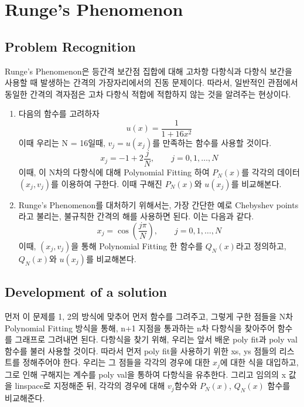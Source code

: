 \documentclass[11pt]{article}
\begin{document}
\section{Runge's Phenomenon}
\subsection{Problem Recognition} 
Runge's Phenomenon은 등간격 보간점 집합에 대해 고차항 다항식과 다항식 보간을 사용할 때 발생하는 간격의 가장자리에서의 진동 문제이다. 따라서, 일반적인 관점에서 동일한 간격의 격자점은 고차 다항식 적합에 적합하지 않는 것을 알려주는 현상이다.

\begin{enumerate}
    \item  다음의 함수를 고려하자
    \begin{equation}
    u(x) = \frac{1}{1 + 16x^2}
    \end{equation}
    이때 우리는 N = 16일때, $v_j = u(x_j)$를 만족하는 함수를 사용할 것이다. 
    \begin{equation}
    x_j = -1 + 2\frac{j}{N}
    ,\qquad
    j = 0, 1, \dots, N
    \end{equation}
    이때, 이 N차의 다항식에 대해 Polynomial Fitting 하여 $P_N(x)$를 각각의 데이터 $(x_j, v_j)$를 이용하여 구한다. 이때 구해진 $P_N(x)$와 $u(x_j)$를 비교해본다.
     \item Runge's Phenomenon를 대처하기 위해서는, 가장 간단한 예로 Chebyshev points라고 불리는, 불규칙한 간격의 해를 사용하면 된다. 이는 다음과 같다.
         \begin{equation}
     x_j = \cos\left(\frac{j\pi}{N}\right)
    ,\qquad
    j = 0, 1, \dots, N
        \end{equation}
        	이때, $(x_j, v_j)$을 통해 Polynomial Fitting 한 함수를 $Q_N(x)$라고 정의하고, $Q_N(x)$와 $u(x_j)$를 비교해본다.
    
\end{enumerate}
\subsection{Development of a solution} 
먼저 이 문제를 1, 2의 방식에 맞추어 먼저 함수를 그려주고, 그렇게 구한 점들을 N차 Polynomial Fitting 방식을 통해, n+1 지점을 통과하는 n차 다항식을 찾아주어 함수를 그래프로 그려내면 된다. 다항식을 찾기 위해, 우리는 앞서 배운 poly fit과 poly val 함수를 불러 사용할 것이다. 따라서 먼저 poly fit을 사용하기 위한 xs, ys 점들의 리스트를 정해주어야 한다. 우리는 그 점들을 각각의 경우에 대한 $x_j$에 대한 식을 대입하고, 그로 인해 구해지는 계수를 poly val을 통하여 다항식을 유추한다. 그리고 임의의 x 값을 linspace로 지정해준 뒤, 각각의 경우에 대해 $v_j$함수와 $P_N(x)$, $Q_N(x)$ 함수를 비교해준다.
\end{document}
